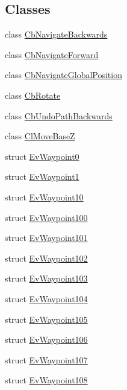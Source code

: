 \subsection*{Classes}
\begin{DoxyCompactItemize}
\item 
class \hyperlink{classmove__base__z__client_1_1CbNavigateBackwards}{Cb\+Navigate\+Backwards}
\item 
class \hyperlink{classmove__base__z__client_1_1CbNavigateForward}{Cb\+Navigate\+Forward}
\item 
class \hyperlink{classmove__base__z__client_1_1CbNavigateGlobalPosition}{Cb\+Navigate\+Global\+Position}
\item 
class \hyperlink{classmove__base__z__client_1_1CbRotate}{Cb\+Rotate}
\item 
class \hyperlink{classmove__base__z__client_1_1CbUndoPathBackwards}{Cb\+Undo\+Path\+Backwards}
\item 
class \hyperlink{classmove__base__z__client_1_1ClMoveBaseZ}{Cl\+Move\+BaseZ}
\item 
struct \hyperlink{structmove__base__z__client_1_1EvWaypoint0}{Ev\+Waypoint0}
\item 
struct \hyperlink{structmove__base__z__client_1_1EvWaypoint1}{Ev\+Waypoint1}
\item 
struct \hyperlink{structmove__base__z__client_1_1EvWaypoint10}{Ev\+Waypoint10}
\item 
struct \hyperlink{structmove__base__z__client_1_1EvWaypoint100}{Ev\+Waypoint100}
\item 
struct \hyperlink{structmove__base__z__client_1_1EvWaypoint101}{Ev\+Waypoint101}
\item 
struct \hyperlink{structmove__base__z__client_1_1EvWaypoint102}{Ev\+Waypoint102}
\item 
struct \hyperlink{structmove__base__z__client_1_1EvWaypoint103}{Ev\+Waypoint103}
\item 
struct \hyperlink{structmove__base__z__client_1_1EvWaypoint104}{Ev\+Waypoint104}
\item 
struct \hyperlink{structmove__base__z__client_1_1EvWaypoint105}{Ev\+Waypoint105}
\item 
struct \hyperlink{structmove__base__z__client_1_1EvWaypoint106}{Ev\+Waypoint106}
\item 
struct \hyperlink{structmove__base__z__client_1_1EvWaypoint107}{Ev\+Waypoint107}
\item 
struct \hyperlink{structmove__base__z__client_1_1EvWaypoint108}{Ev\+Waypoint108}
\item 

\end{DoxyCompactItemize}
